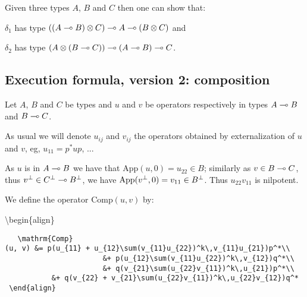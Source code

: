 Given three types \(A\), \(B\) and \(C\) then one can show that:

\begin{description}
\tightlist
\item[]
\(\delta_1\) has type \(((A\multimap B)\otimes C)\multimap A\multimap (B\otimes C)\) and

\(\delta_2\) has type \((A\otimes(B\multimap C))\multimap (A\multimap B)\multimap C\).
\end{description}

\subsection{Execution formula, version 2: composition}\label{execution-formula-version-2-composition}

Let \(A\), \(B\) and \(C\) be types and \(u\) and \(v\) be operators
respectively in types \(A\multimap B\) and \(B\multimap C\).

As usual we will denote \(u_{ij}\) and \(v_{ij}\) the operators obtained
by externalization of \(u\) and \(v\), eg, \(u_{11} = p^*up\), ...

As \(u\) is in \(A\multimap B\) we have that
\(\mathrm{App}(u, 0)=u_{22}\in B\); similarly as \(v\in B\multimap C\), thus
\(v^\bot\in C^\bot\multimap B^\bot\), we have
\(\mathrm{App}(v^\bot, 0) = v_{11}\in B^\bot\). Thus \(u_{22}v_{11}\) is
nilpotent.

We define the operator \(\mathrm{Comp}(u, v)\) by:

\begin{description}
\tightlist
\item[]
\textbackslash{}begin\{align\}
\end{description}

\texttt{~~~\textbackslash{}mathrm\{Comp\}(u,~v)~\&=~p(u\_\{11\}~+~u\_\{12\}\textbackslash{}sum(v\_\{11\}u\_\{22\})\^{}k\textbackslash{},v\_\{11\}u\_\{21\})p\^{}*\textbackslash{}\textbackslash{}}\\
\texttt{~~~~~~~~~~~~~~~~~~~~~~~\&+~p(u\_\{12\}\textbackslash{}sum(v\_\{11\}u\_\{22\})\^{}k\textbackslash{},v\_\{12\})q\^{}*\textbackslash{}\textbackslash{}}\\
\texttt{~~~~~~~~~~~~~~~~~~~~~~~\&+~q(v\_\{21\}\textbackslash{}sum(u\_\{22\}v\_\{11\})\^{}k\textbackslash{},u\_\{21\})p\^{}*\textbackslash{}\textbackslash{}}\\
\texttt{~~~~~~~~~~~\&+~q(v\_\{22\}~+~v\_\{21\}\textbackslash{}sum(u\_\{22\}v\_\{11\})\^{}k\textbackslash{},u\_\{22\}v\_\{12\})q\^{}*}\\
\texttt{~\textbackslash{}end\{align\}}

